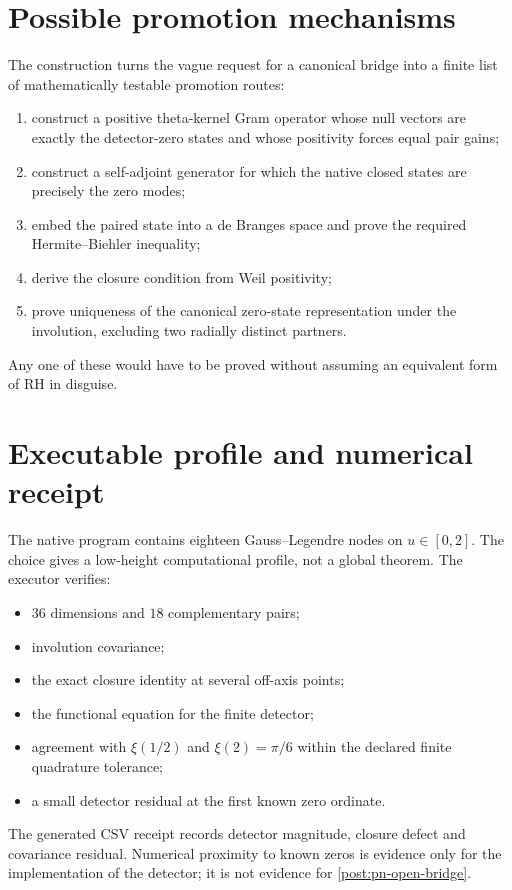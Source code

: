 \section{Possible promotion mechanisms}

The construction turns the vague request for a canonical bridge into a finite
list of mathematically testable promotion routes:
\begin{enumerate}
 \item construct a positive theta-kernel Gram operator whose null vectors are
 exactly the detector-zero states and whose positivity forces equal pair gains;
 \item construct a self-adjoint generator for which the native closed states are
 precisely the zero modes;
 \item embed the paired state into a de Branges space and prove the required
 Hermite--Biehler inequality;
 \item derive the closure condition from Weil positivity;
 \item prove uniqueness of the canonical zero-state representation under the
 involution, excluding two radially distinct partners.
\end{enumerate}
Any one of these would have to be proved without assuming an equivalent form of
RH in disguise.

\section{Executable profile and numerical receipt}

The native program contains eighteen Gauss--Legendre nodes on $u\in[0,2]$.  The
choice gives a low-height computational profile, not a global theorem.  The
executor verifies:
\begin{itemize}
 \item $36$ dimensions and $18$ complementary pairs;
 \item involution covariance;
 \item the exact closure identity at several off-axis points;
 \item the functional equation for the finite detector;
 \item agreement with $\xi(1/2)$ and $\xi(2)=\pi/6$ within the declared finite
 quadrature tolerance;
 \item a small detector residual at the first known zero ordinate.
\end{itemize}
The generated CSV receipt records detector magnitude, closure defect and
covariance residual.  Numerical proximity to known zeros is evidence only for
the implementation of the detector; it is not evidence for
\cref{post:pn-open-bridge}.


